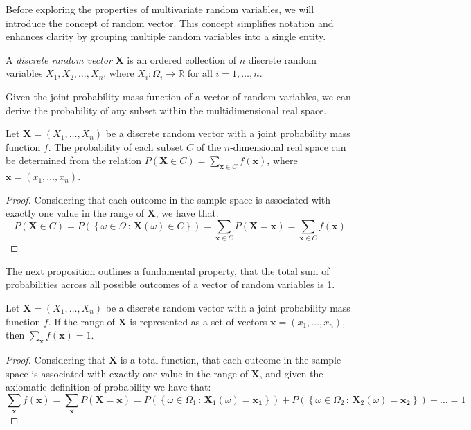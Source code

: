 Before exploring the properties of multivariate random variables, we will introduce the concept of random vector. This concept simplifies notation and enhances clarity by grouping multiple random variables into a single entity.

\begin{definition}
A \emph{discrete random vector} $\mathbf{X}$ is an ordered collection of $n$ discrete random variables $X_1, X_2, \ldots, X_n$, where $X_i : \Omega_i \rightarrow \mathbb{R}$ for all $i=1, \ldots, n$.
\end{definition}

Given the joint probability mass function of a vector of random variables, we can derive the probability of any subset within the multidimensional real space.

\begin{proposition}
Let $\mathbf{X}=\left(X_{1}, \ldots, X_{n}\right)$ be a discrete random vector with a joint probability mass function $f$. The probability of each subset $C$ of the $n$-dimensional real space can be determined from the relation $P\left(\mathbf{X} \in C\right)=\sum_{\mathbf{x} \in C}f\left(\mathbf{x}\right)$, where $\mathbf{x} = (x_{1}, \ldots, x_{n})$.
\end{proposition}
\begin{proof}
Considering that each outcome in the sample space is associated with exactly one value in the range of $\mathbf{X}$, we have that:
\[
P\left(\mathbf{X} \in C\right) = P \left( \left\{ \omega \in \Omega \,:\, \mathbf{X}(\omega) \in C\right\} \right) = \sum_{\mathbf{x}\in C} P\left( \mathbf{X} = \mathbf{x} \right) = \sum_{\mathbf{x}\in C}f\left(\mathbf{x}\right)
\]
\end{proof}

The next proposition outlines a fundamental property, that the total sum of probabilities across all possible outcomes of a vector of random variables is 1.

\begin{proposition}
Let $\mathbf{X}=\left(X_{1}, \ldots, X_{n}\right)$ be a discrete random vector with a joint probability mass function $f$. If the range of $\mathbf{X}$ is represented as a set of vectors $\mathbf{x} = (x_{1}, \ldots, x_{n})$, then $\sum_{\mathbf{x}}f\left(\mathbf{x}\right)=1$.
\end{proposition}
\begin{proof}
Considering that $\mathbf{X}$ is a total function, that each outcome in the sample space is associated with exactly one value in the range of $\mathbf{X}$, and given the axiomatic definition of probability we have that:
\[
\sum_{\mathbf{x}} f(\mathbf{x}) = \sum_{\mathbf{x}} P\left( \mathbf{X} = \mathbf{x} \right) = P \left( \left\{ \omega \in \Omega_1 \,:\, \mathbf{X}_1(\omega) = \mathbf{x_1} \right\} \right) + P \left( \left\{ \omega \in \Omega_2 \,:\, \mathbf{X}_2(\omega) = \mathbf{x_2} \right\} \right) + \ldots = 1 
\]
\end{proof}


